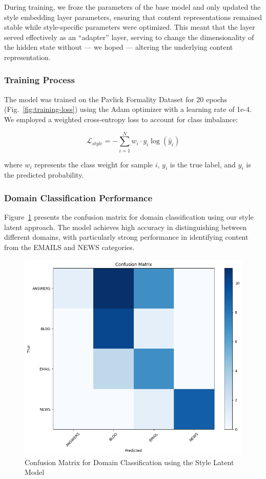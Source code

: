 \documentclass{article}
\begin{document}
During training, we froze the parameters of the base model and only updated the style embedding layer parameters, ensuring that content representations remained stable while style-specific parameters were optimized.
This meant that the layer served effectively as an ``adapter'' layer, serving to change the dimensionality of the hidden state without --- we hoped --- altering the underlying content representation.

\subsubsection{Training Process}
The model was trained on the Pavlick Formality Dataset for 20 epochs (Fig.~\ref{fig:training-loss}) using the Adam optimizer with a learning rate of 1e-4.
We employed a weighted cross-entropy loss to account for class imbalance:

\begin{equation}
\mathcal{L}_{style} = -\sum_{i=1}^{N} w_i \cdot y_i \log(\hat{y}_i)
\end{equation}

where $w_i$ represents the class weight for sample $i$, $y_i$ is the true label, and $\hat{y}_i$ is the predicted probability.

\subsubsection{Domain Classification Performance}
Figure~\ref{fig:domain-confusion} presents the confusion matrix for domain classification using our style latent approach. The model achieves high accuracy in distinguishing between different domains, with particularly strong performance in identifying content from the EMAILS and NEWS categories.

\begin{figure}
    \centering
    \includegraphics[width=0.9\linewidth]{figures/4_confusion.png}
    \caption{Confusion Matrix for Domain Classification using the Style Latent Model}
    \label{fig:domain-confusion}
\end{figure}
\end{document}
